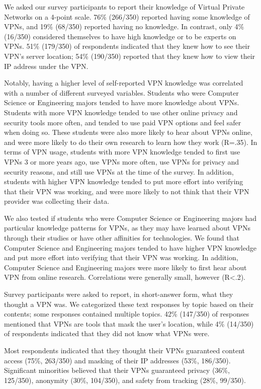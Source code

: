 We asked our survey participants to report their knowledge of Virtual Private
Networks on a 4-point scale. 76\% (266/350) reported having some knowledge of
VPNs, and 19\% (68/350) reported having no knowledge. In contrast, only 4\%
(16/350) considered themselves to have high knowledge or to be experts on
VPNs. 51\% (179/350) of respondents indicated that they knew how to see their
VPN’s server location; 54\% (190/350) reported that they knew how to view
their IP address under the VPN.

Notably, having a higher level of self-reported VPN knowledge was correlated
with a number of different surveyed variables. Students who were Computer
Science or Engineering majors tended to have more knowledge about VPNs.
Students with more VPN knowledge tended to use other online privacy and
security tools more often, and tended to use paid VPN options and feel safer
when doing so. These students were also more likely to hear about VPNs online,
and were more likely to do their own research to learn how they work (R=.35).
In terms of VPN usage, students with more VPN knowledge tended to first use
VPNs 3 or more years ago, use VPNs more often, use VPNs for privacy and
security reasons, and still use VPNs at the time of the survey. In addition,
students with higher VPN knowledge tended to put more effort into verifying
that their VPN was working, and were more likely to not think that their VPN
provider was collecting their data.

We also tested if students who were Computer Science or Engineering majors had
particular knowledge patterns for VPNs, as they may have learned about VPNs
through their studies or have other affinities for technologies. We found that
Computer Science and Engineering majors tended to have higher VPN knowledge
and put more effort into verifying that their VPN was working. In addition,
Computer Science and Engineering majors were more likely to first hear about
VPN from online research. Correlations were generally small, however (R<.2).

Survey participants were asked to report, in short-answer form, what they
thought a VPN was. We categorized these text responses by topic based on their
contents; some responses contained multiple topics. 42\% (147/350) of
responses mentioned that VPNs are tools that mask the user’s location, while
4\% (14/350) of respondents indicated that they did not know what VPNs were.

Most respondents indicated that they thought their VPNs guaranteed content
access (75\%, 263/350) and masking of their IP addresses (53\%, 186/350).
Significant minorities believed that their VPNs guaranteed privacy (36\%,
125/350), anonymity (30\%, 104/350), and safety from tracking (28\%, 99/350).

